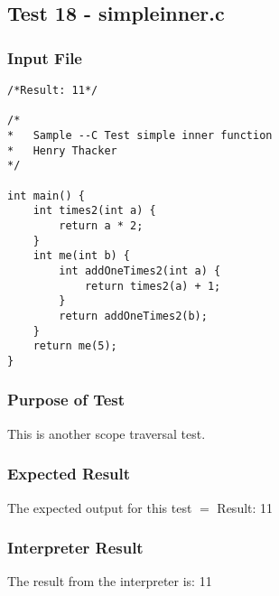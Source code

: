 \subsection{Test 18 - simpleinner.c}
\subsubsection{Input File}
\begin{lstlisting}[showstringspaces=false,breaklines=true,backgroundcolor=\color{light-gray}, captionpos=b]
/*Result: 11*/

/*
*	Sample --C Test simple inner function
*	Henry Thacker
*/

int main() {
	int times2(int a) {
		return a * 2;
	}
	int me(int b) {
		int addOneTimes2(int a) { 
			return times2(a) + 1; 
		}
		return addOneTimes2(b);
	}
	return me(5);
}
\end{lstlisting}\subsubsection{Purpose of Test}
This is another scope traversal test.

\subsubsection{Expected Result}
The expected output for this test $=$ Result: 11
\subsubsection{Interpreter Result}
The result from the interpreter is: 11
